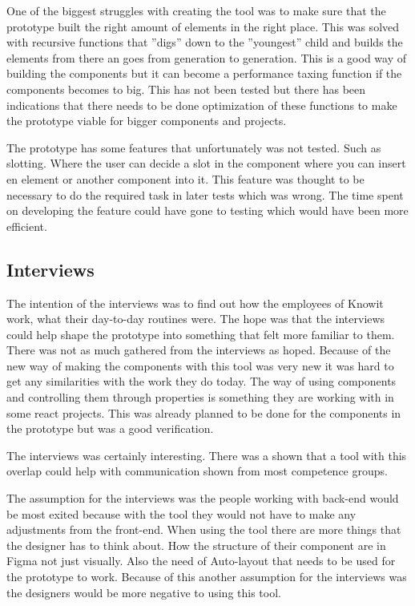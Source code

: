 One of the biggest struggles with creating the tool was to make sure that the prototype built the right amount of elements in the right place. This was solved with recursive functions that ''digs'' down to the ''youngest'' child and builds the elements from there an goes from generation to generation. This is a good way of building the components but it can become a performance taxing function if the components becomes to big. This has not been tested but there has been indications that there needs to be done optimization of these functions to make the prototype viable for bigger components and projects.

The prototype has some features that unfortunately was not tested. Such as slotting. Where the user can decide a slot in the component where you can insert en element or another component into it. This feature was thought to be necessary to do the required task in later tests which was wrong. The time spent on developing the feature could have gone to testing which would have been more efficient.

\subsection{Interviews}%
\label{sub:Interviews}

The intention of the interviews was to find out how the employees of Knowit work, what their day-to-day routines were. The hope was that the interviews could help shape the prototype into something that felt more familiar to them. There was not as much gathered from the interviews as hoped. Because of the new way of making the components with this tool was very new it was hard to get any similarities with the work they do today. The way of using components and controlling them through properties is something they are working with in some react projects. This was already planned to be done for the components in the prototype but was a good verification.

The interviews was certainly interesting. There was a shown that a tool with this overlap could help with communication shown from most competence groups.

The assumption for the interviews was the people working with back-end would be most exited because with the tool they would not have to make any adjustments from the front-end. When using the tool there are more things that the designer has to think about. How the structure of their component are in Figma not just visually. Also the need of Auto-layout that needs to be used for the prototype to work. Because of this another assumption for the interviews was the designers would be more negative to using this tool. 

